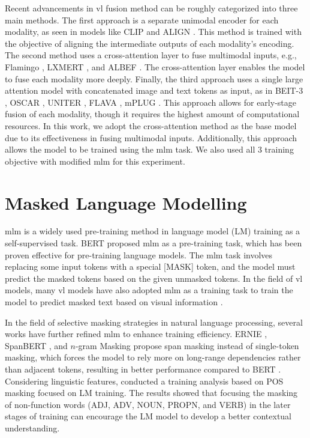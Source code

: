 Recent advancements in \acrshort{vl} fusion method can be roughly categorized into three main methods.  
The first approach is a separate unimodal encoder for each modality, as seen in models like CLIP \cite{clip} and ALIGN \cite{align}. 
This method is trained with the objective of aligning the intermediate outputs of each modality's encoding.  
The second method uses a cross-attention layer to fuse multimodal inputs, e.g., Flamingo \cite{flamingo}, LXMERT \cite{lxmert}, and ALBEF \cite{albef}. 
The cross-attention layer enables the model to fuse each modality more deeply.  
Finally, the third approach uses a single large attention model with concatenated image and text tokens as input, as in BEIT-3 \cite{beit-3}, OSCAR \cite{oscar}, UNITER \cite{uniter}, FLAVA \cite{flava}, mPLUG \cite{mplug}. 
This approach allows for early-stage fusion of each modality, though it requires the highest amount of computational resources.  
In this work, we adopt the cross-attention method as the base model due to its effectiveness in fusing multimodal inputs. 
Additionally, this approach allows the model to be trained using the \acrshort{mlm} task.
We also used all 3 training objective with modified \Acrshort{mlm} for this experiment.

\section{Masked Language Modelling}
\acrshort{mlm} is a widely used pre-training method in language model (LM) training \cite{bert, albert, dictbert, opt, realm} as a self-supervised task. 
BERT \cite{bert} proposed \acrshort{mlm} as a pre-training task, which has been proven effective for pre-training language models. 
The \acrshort{mlm} task involves replacing some input tokens with a special [MASK] token, and the model must predict the masked tokens based on the given unmasked tokens. 
In the field of \acrshort{vl} models, many \acrshort{vl} models have also adopted \acrshort{mlm} as a training task to train the model to predict masked text based on visual information \cite{albef, mplug, uniter, beit-3}.

In the field of selective masking strategies in natural language processing, several works have further refined \acrshort{mlm} to enhance training efficiency. 
ERNIE \cite{ERNIE}, SpanBERT \cite{spanBERT}, and \(n\)-gram Masking \cite{n-gram-masking} propose span masking instead of single-token masking, which forces the model to rely more on long-range dependencies rather than adjacent tokens, resulting in better performance compared to BERT \cite{bert}. 
Considering linguistic features,  conducted a training analysis based on POS masking focused on LM training. 
The results showed that focusing the masking of non-function words (ADJ, ADV, NOUN, PROPN, and VERB) in the later stages of training can encourage the LM model to develop a better contextual understanding.

